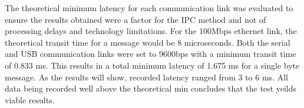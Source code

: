 The theoretical minimum latency for each communication link was evaluated to ensure the results obtained were a factor for the IPC method and not of processing delays and technology limitations. For the 100Mbps ethernet link, the theoretical transit time for a message would be 8 microseconds. Both the serial and USB communication links were set to 9600bps with a minimum transit time of 0.833 ms. This results in a total minimum latency of 1.675 ms for a single byte message. As the results will show, recorded latency ranged from 3 to 6 ms. All data being recorded well above the theoretical min concludes that the test yeilds viable results.
